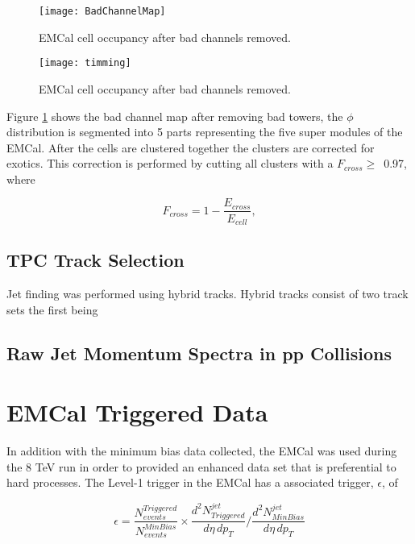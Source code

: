 \begin{figure}[h]
\texttt{[image: BadChannelMap]}
\centering
\caption{EMCal cell occupancy after bad channels removed.}
\label{fig:badchannel}
\end{figure}

\begin{figure}[h]
\texttt{[image: timming]}
\centering
\caption{EMCal cell occupancy after bad channels removed.}
\label{fig:EMCaltime}
\end{figure}

\noindent
Figure \ref{fig:badchannel} shows the bad channel map after removing bad towers, the $\phi$ distribution is segmented into 5 parts representing the five super modules of the EMCal.  After the cells are clustered together the clusters are corrected for exotics.  This correction is performed by cutting all clusters with a $F_{cross} \geq \,$ 0.97, where

\begin{equation}
F_{cross} = 1 - \frac{ E_{cross} }{ E_{cell} },
\label{eq:Fcross}
\end{equation}

\noindent
 
\subsection{TPC Track Selection}
Jet finding was performed using hybrid tracks.  Hybrid tracks consist of two track sets the first being

\subsection{Raw Jet Momentum Spectra in pp Collisions}

\section{EMCal Triggered Data}

In addition with the minimum bias data collected, the EMCal was used during the 8 TeV run in order to provided an enhanced data set that is preferential to hard processes.   The Level-1 trigger\cite{Bourrion:2010js} in the EMCal has a associated trigger, $\epsilon$, of 

\begin{equation}
	\epsilon = \frac{N^{Triggered}_{events}}{N^{MinBias}_{events}} \times \frac{d^{2} N_{Triggered}^{jet}}{d\eta \, dp_{T}} \Bigg/  \frac{d^{2} N_{MinBias}^{jet}}{d\eta \, dp_{T}} 
\label{eq:xsecdef}
\end{equation}

